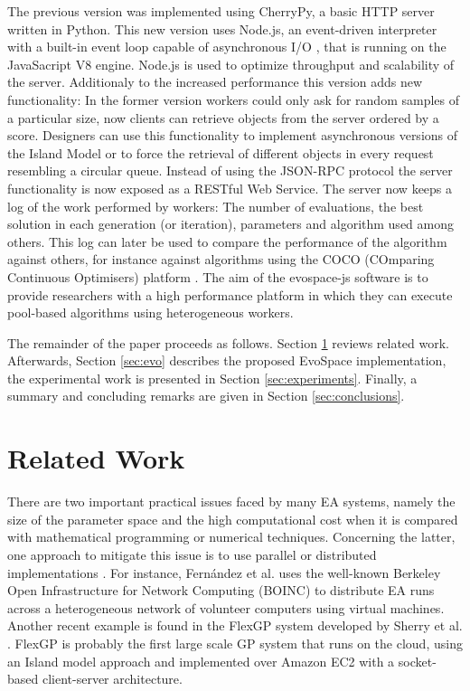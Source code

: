 The previous version %
was implemented using CherryPy, a basic HTTP 
server written in Python. This new version uses Node.js, an 
event-driven interpreter with a built-in event loop capable of
asynchronous I/O \cite{tilkov2010node}, that is 
running on the JavaSacript V8 engine. Node.js is used 
to optimize throughput and scalability of the server. %
Additionaly to the  increased performance this version 
adds new functionality: In the former version workers could only
ask for random samples of a particular size, now clients 
can retrieve objects from the server ordered by a score. 
Designers can use this functionality to implement 
asynchronous versions of the Island Model or to force 
the retrieval of different objects in every request 
resembling a circular queue. Instead of using the JSON-RPC 
protocol the server functionality is now exposed as a RESTful 
Web Service. The server now keeps a log of the work performed 
by workers: The number of evaluations, the best solution in each 
generation (or iteration), parameters and algorithm used among others.
This log can later be used to compare the performance of 
the algorithm against others, for instance against 
algorithms using the COCO (COmparing Continuous Optimisers)
platform \cite{hansen2016coco}.
The aim of the {\sf evospace-js} software is to provide 
researchers with a high performance platform in which 
they can execute pool-based algorithms using heterogeneous workers. 

The remainder of the paper proceeds as follows. Section \ref{sec:work} 
reviews related work. Afterwards, Section \ref{sec:evo} describes the
proposed EvoSpace implementation, the experimental work is presented in 
Section \ref{sec:experiments}. Finally, a summary and 
concluding remarks are given in Section \ref{sec:conclusions}.


\section{Related Work}
\label{sec:work}
There are two important practical issues faced by many EA systems, namely the size of the parameter 
space and the high computational cost when it is compared with mathematical programming or numerical techniques.
Concerning the latter, one approach to mitigate this issue is to use parallel or 
distributed implementations \cite{cantu-paz:migration-policies,duda2013gpu}.
For instance, Fern\'andez et al. \cite{nc} %
uses the well-known Berkeley Open Infrastructure for Network Computing (BOINC) to distribute EA runs across a
heterogeneous network of volunteer computers using virtual machines. Another recent example is 
found in the FlexGP system developed by Sherry et al. \cite{sherry2012flex}. FlexGP is probably the first large scale GP system 
that runs on the cloud, using an Island model approach and implemented over Amazon EC2 with a 
socket-based client-server architecture.

